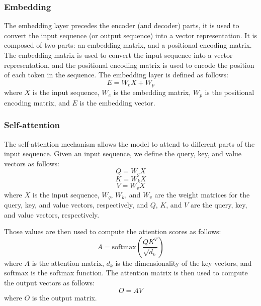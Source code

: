 \documentclass[a4paper]{sapthesis}
\begin{document}
\subsubsection{Embedding}
The embedding layer precedes the encoder (and decoder) parts, it is used to convert 
the input sequence (or output sequence) into a vector
 representation. It is composed of two parts: an 
 embedding matrix, and a positional encoding matrix. The embedding matrix
  is used to convert the input sequence into a vector representation, and
   the positional encoding matrix is used to encode the position of each 
   token in the sequence. The embedding layer is defined as follows:
   \begin{equation}
     E = W_{e}X + W_p
     \end{equation}
where $X$ is the input sequence, $W_e$ is the embedding matrix, $W_p$ is the
 positional encoding matrix, and $E$ is the embedding vector.
\subsubsection{Self-attention}
The self-attention mechanism allows the model to 
attend to different parts of the input sequence. Given an input sequence,
we define the query, key, and value vectors as follows:
\begin{equation}
  Q = W_{q}X
  \end{equation}
\begin{equation}
  K = W_{k}X
  \end{equation}
\begin{equation}
  V = W_{v}X
  \end{equation}
where $X$ is the input sequence, $W_q$, $W_k$, and $W_v$ are the weight
  matrices for the query, key, and value vectors, respectively, and $Q$,
  $K$, and $V$ are the query, key, and value vectors, respectively. 
  
  Those values are then used to compute the attention scores as follows:
  \begin{equation}
    A = \text{softmax}\left(\frac{QK^T}{\sqrt{d_k}}\right)
    \end{equation}
where $A$ is the attention matrix, $d_k$ is the dimensionality of the
  key vectors, and $\text{softmax}$ is the softmax function. The 
  attention matrix is then used to compute the output vectors as follows:
  \begin{equation}
    O = AV
    \end{equation}
where $O$ is the output matrix. 
\end{document}
